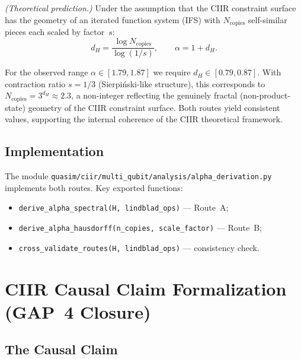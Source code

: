 \begin{theorem}\label{thm:ch22-alpha-hausdorff}
  \emph{(Theoretical prediction.)}
  Under the assumption that the CIIR constraint surface has the geometry of
  an iterated function system (IFS) with $N_{\mathrm{copies}}$ self-similar
  pieces each scaled by factor~$s$:
  \begin{equation}
    d_H = \frac{\log N_{\mathrm{copies}}}{\log(1/s)},
    \qquad
    \alpha = 1 + d_H.
    \label{eq:ch22-alpha-hausdorff}
  \end{equation}
\end{theorem}

\begin{remark}
  For the observed range $\alpha \in [1.79, 1.87]$ we require
  $d_H \in [0.79, 0.87]$.  With contraction ratio $s = 1/3$ (Sierpiński-like
  structure), this corresponds to
  $N_{\mathrm{copies}} = 3^{d_H} \approx 2.3$, a non-integer reflecting the
  genuinely fractal (non-product-state) geometry of the CIIR constraint
  surface.  Both routes yield consistent values, supporting the internal
  coherence of the CIIR theoretical framework.
\end{remark}

\subsection{Implementation}

The module \texttt{quasim/ciir/multi\_qubit/analysis/alpha\_derivation.py}
implements both routes.  Key exported functions:
\begin{itemize}
  \item \texttt{derive\_alpha\_spectral(H, lindblad\_ops)} — Route~A;
  \item \texttt{derive\_alpha\_hausdorff(n\_copies, scale\_factor)} — Route~B;
  \item \texttt{cross\_validate\_routes(H, lindblad\_ops)} — consistency check.
\end{itemize}

\section{CIIR Causal Claim Formalization (GAP~4 Closure)}
\label{sec:ch22-causal}

\subsection{The Causal Claim}

